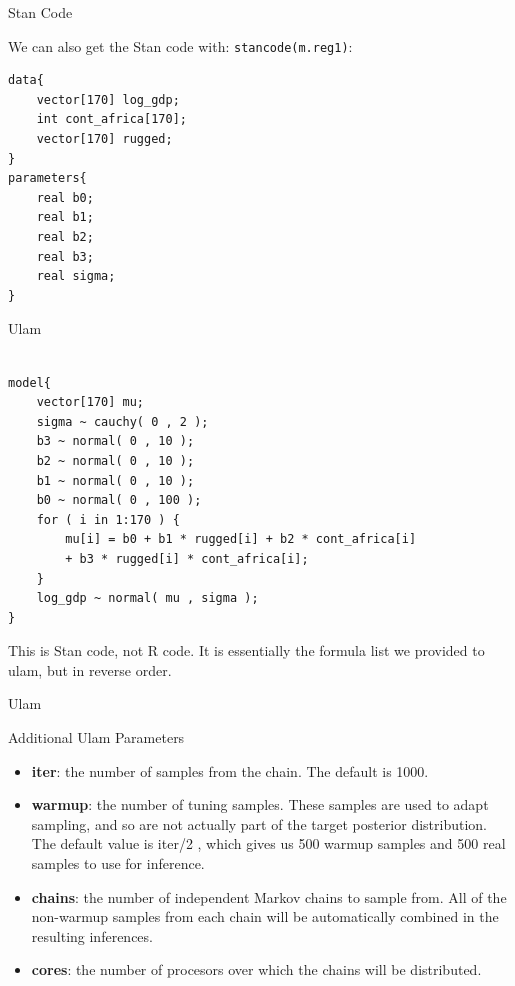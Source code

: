 \documentclass[handout]{beamer}
\begin{document}
\begin{frame}[fragile]{Stan Code}
\scriptsize{

 We can also get the Stan code with: \verb+stancode(m.reg1)+:  
\begin{verbatim}
data{
    vector[170] log_gdp;
    int cont_africa[170];
    vector[170] rugged;
}
parameters{
    real b0;
    real b1;
    real b2;
    real b3;
    real sigma;
}

\end{verbatim}


} 
\end{frame}


\begin{frame}[fragile]{Ulam}
\scriptsize{

 
\begin{verbatim}

model{
    vector[170] mu;
    sigma ~ cauchy( 0 , 2 );
    b3 ~ normal( 0 , 10 );
    b2 ~ normal( 0 , 10 );
    b1 ~ normal( 0 , 10 );
    b0 ~ normal( 0 , 100 );
    for ( i in 1:170 ) {
        mu[i] = b0 + b1 * rugged[i] + b2 * cont_africa[i] 
        + b3 * rugged[i] * cont_africa[i];
    }
    log_gdp ~ normal( mu , sigma );
}

\end{verbatim}

This is Stan code, not R code. It is essentially the formula list we provided to ulam, but in reverse order.

} 
\end{frame}


\begin{frame}[fragile]{Ulam}
\scriptsize{


\begin{block}{Additional Ulam Parameters}
\begin{itemize}


\item \textbf{iter}: the number of samples from the chain. The default is 1000.
\item \textbf{warmup}: the number of tuning samples. These samples are used to adapt sampling, and so are not actually part of the target posterior distribution. The default value is iter/2 , which gives us 500 warmup samples and 500 real samples to use for inference.

\item \textbf{chains}: the number of independent Markov chains to sample from. All of the non-warmup samples from each chain will be automatically combined in the resulting inferences.

\item \textbf{cores}: the number of procesors over which the chains will be distributed.



 \end{itemize}

 \end{block}






} 
\end{frame}
\end{document}
